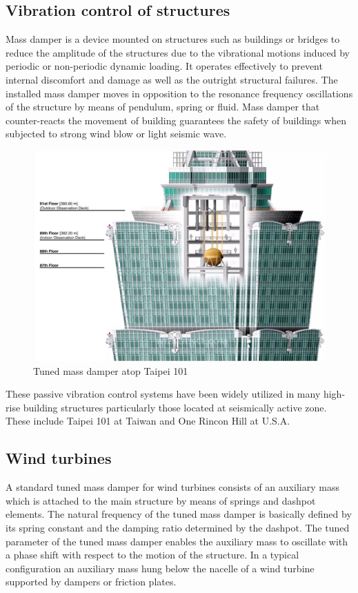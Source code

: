 \subsection{Vibration control of structures}
Mass damper is a device mounted on structures such as buildings or bridges to reduce the amplitude of the structures due to the vibrational motions induced by periodic or non-periodic dynamic loading. It operates effectively to prevent internal discomfort and damage as well as the outright structural failures. The installed mass damper moves in opposition to the resonance frequency oscillations of the structure by means of pendulum, spring or fluid. Mass damper that counter-reacts the movement of building guarantees the safety of buildings when subjected to strong wind blow or light seismic wave.
\begin{figure}[h]
\centering
\includegraphics[scale=0.25]{"figures/tmdbuild"}
\caption{Tuned mass damper atop Taipei 101}
\label{taipei}
\end{figure}
These passive vibration control systems have been widely utilized in many high-rise building structures particularly those located at seismically active zone. These include Taipei 101 at Taiwan and One Rincon Hill at U.S.A.

\subsection{Wind turbines}
A standard tuned mass damper for wind turbines consists of an auxiliary mass which is attached to the main structure by means of springs and dashpot elements. The natural frequency of the tuned mass damper is basically defined by its spring constant and the damping ratio determined by the dashpot. The tuned parameter of the tuned mass damper enables the auxiliary mass to oscillate with a phase shift with respect to the motion of the structure. In a typical configuration an auxiliary mass hung below the nacelle of a wind turbine supported by dampers or friction plates.

